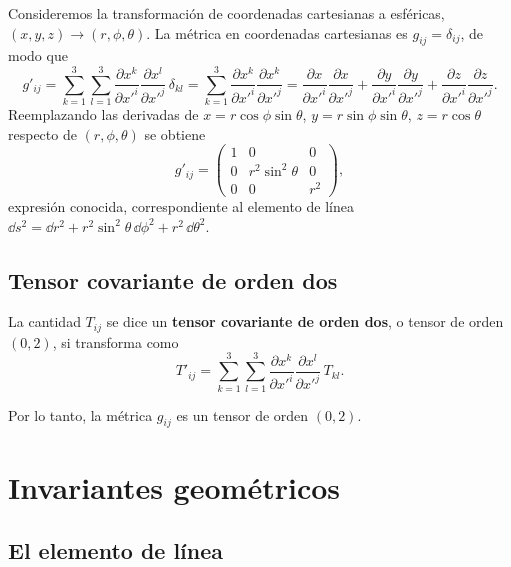 Consideremos la transformación de coordenadas cartesianas a esféricas, $(x,y,z)\to(r,\phi,\theta)$. La métrica en coordenadas cartesianas es $g_{ij}=\delta_{ij}$, de modo que
\begin{equation}
g'_{ij} = \sum_{k=1}^3\sum_{l=1}^3 \frac{\partial x^k}{\partial x'^i}\frac{\partial x^l}{\partial x'^j}\,\delta_{kl}
= \sum_{k=1}^3 \frac{\partial x^k}{\partial x'^i}\frac{\partial x^k}{\partial x'^j}
= \frac{\partial x}{\partial x'^i}\frac{\partial x}{\partial x'^j} + \frac{\partial y}{\partial x'^i}\frac{\partial y}{\partial x'^j} + \frac{\partial z}{\partial x'^i}\frac{\partial z}{\partial x'^j} .
\end{equation}
Reemplazando las derivadas de $x=r\cos\phi\sin\theta$, $y=r\sin\phi\sin\theta$, $z=r\cos\theta$ respecto de $(r,\phi,\theta)$ se obtiene
\begin{equation}
g'_{ij} =
\begin{pmatrix}
1 & 0 & 0 \\
0 & r^2\sin^2\theta & 0 \\
0 & 0 & r^2
\end{pmatrix},
\end{equation}
expresión conocida, correspondiente al elemento de línea $\dd s^2 = \dd r^2 + r^2\sin^2\theta\,\dd\phi^2 + r^2\,\dd\theta^2$.

\subsection{Tensor covariante de orden dos}

\begin{definicion}
La cantidad $T_{ij}$ se dice un \textbf{tensor covariante de orden dos}, o tensor de orden $(0,2)$, si transforma como
\begin{equation}
T'_{ij} = \sum_{k=1}^3\sum_{l=1}^3 \frac{\partial x^k}{\partial x'^i}\frac{\partial x^l}{\partial x'^j}\, T_{kl} .
\end{equation}
\end{definicion}
Por lo tanto, la métrica $g_{ij}$ es un tensor de orden $(0,2)$.

\section{Invariantes geométricos}

\subsection{El elemento de línea}

